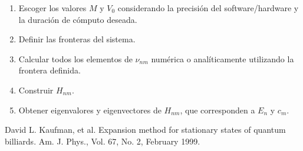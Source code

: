 \documentclass[letterpaper,11pt]{article}
\begin{document}
\begin{enumerate}
\item Escoger los valores $M$ y $V_0$ considerando la precisión del software/hardware y la duración de cómputo deseada.
\item Definir las fronteras del sistema.
\item Calcular todos los elementos  de $\nu_{nm}$ numérica o analíticamente utilizando la frontera definida.
\item Construir $H_{nm}$.
\item Obtener eigenvalores y eigenvectores de $H_{nm}$, que corresponden a $E_n$ y $c_m$.
\end{enumerate}

\renewcommand*{\refname}{}
\begin{thebibliography}{100}

 David L. Kaufman, et al. Expansion method for stationary states of quantum billiards. Am. J. Phys., Vol. 67, No. 2, February 1999.

\end{thebibliography}
\end{document}
